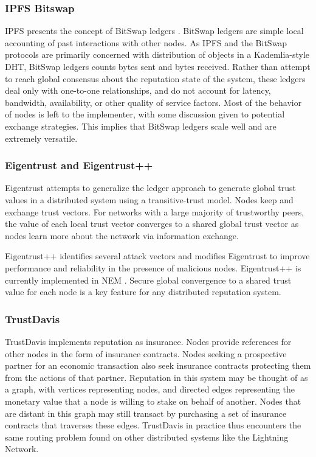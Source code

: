 \documentclass[a4paper,10pt]{article}
\begin{document}
\subsubsection{IPFS Bitswap}
IPFS presents the concept of BitSwap ledgers \cite{18}. BitSwap ledgers are simple local accounting of past interactions with other nodes. As IPFS and the BitSwap protocols are primarily concerned with distribution of objects in a Kademlia-style DHT, BitSwap ledgers counts bytes sent and bytes received. Rather than attempt to reach global consensus about the reputation state of the system, these ledgers deal only with one-to-one relationships, and do not account for latency, bandwidth, availability, or other quality of service factors. Most of the behavior of nodes is left to the implementer, with some discussion given to potential exchange strategies. This implies that BitSwap ledgers scale well and are extremely versatile.

\subsubsection{Eigentrust and Eigentrust++}
Eigentrust \cite{19} attempts to generalize the ledger approach to generate global trust values in a distributed system using a transitive-trust model. Nodes keep and exchange trust vectors. For networks with a large majority of trustworthy peers, the value of each local trust vector converges to a shared global trust vector as nodes learn more about the network via information exchange.

Eigentrust++ \cite{20} identifies several attack vectors and modifies Eigentrust to improve performance and reliability in the presence of malicious nodes. Eigentrust++ is currently implemented in NEM \cite{21}.  Secure global convergence to a shared trust value for each node is a key feature for any distributed reputation system.

\subsubsection{TrustDavis}
TrustDavis \cite{22} implements reputation as insurance. Nodes provide references for other nodes in the form of insurance contracts. Nodes seeking a prospective partner for an economic transaction also seek insurance contracts protecting them from the actions of that partner. Reputation in this system may be thought of as a graph, with vertices representing nodes, and directed edges representing the monetary value that a node is willing to stake on behalf of another. Nodes that are distant in this graph may still transact by purchasing a set of insurance contracts that traverses these edges. TrustDavis in practice thus encounters the same routing problem found on other distributed systems like the Lightning Network.
\end{document}
